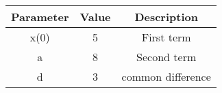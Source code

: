 

    \begin{tabular}{|c|c|c|}
        \hline
        \textbf{Parameter} & \textbf{Value} & \textbf{Description} \\
        \hline
        x(0) & 5 & First term \\
        a     & 8 & Second term \\
        d     & 3 & common difference\\
        \hline
    \end{tabular}
    
    


